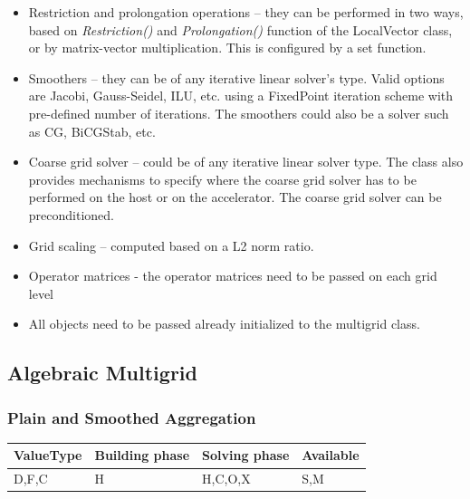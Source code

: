 \begin{itemize}
\itemsep0em

\item Restriction and prolongation operations -- they can be performed in two ways, based on \emph{Restriction()} and \emph{Prolongation()} function of the LocalVector class, or by matrix-vector multiplication. This is configured by a set function.

\item Smoothers -- they can be of any iterative linear solver's type. Valid options are Jacobi, Gauss-Seidel, ILU, etc. using a FixedPoint iteration scheme with pre-defined number of iterations. The smoothers could also be a solver such as CG, BiCGStab, etc.

\item Coarse grid solver -- could be of any iterative linear solver type. The class also provides mechanisms to specify where the coarse grid solver has to be performed on the host or on the accelerator. The coarse grid solver can be preconditioned.

\item Grid scaling -- computed based on a L2 norm ratio.

\item Operator matrices - the operator matrices need to be passed on each grid level

\item All objects need to be passed already initialized to the multigrid class.

\end{itemize}

\subsection{Algebraic Multigrid}

\subsubsection{Plain and Smoothed Aggregation}

\begin{table}[H]
\begin{tabular}{l|l|l|l}
\multicolumn{1}{c|}{ValueType} & Building phase & Solving phase & Available \\ \hline
D,F,C                          & H              & H,C,O,X       & S,M      
\end{tabular}
\end{table}


